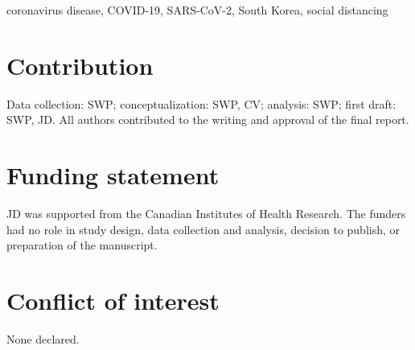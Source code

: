 coronavirus disease, COVID-19, SARS-CoV-2, South Korea, social distancing

\section*{Contribution}

Data collection: SWP; conceptualization: SWP, CV; analysis: SWP; first draft: SWP, JD. All authors contributed to the writing and approval of the final report.

\section*{Funding statement}

JD was supported from the Canadian Institutes of Health Research. The funders had no role in study design, data collection and analysis, decision to publish, or preparation of the manuscript.

\section*{Conflict of interest}

None declared.